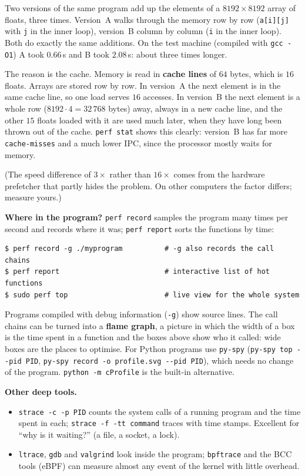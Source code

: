 \begin{example}
Two versions of the same program add up the elements of a $8192\times8192$ array of floats, three times. Version~A walks through the memory row by row (\texttt{a[i][j]} with \texttt{j} in the inner loop), version~B column by column (\texttt{i} in the inner loop). Both do exactly the same additions. On the test machine (compiled with \texttt{gcc -O1}) A took $0.66$\,s and B took $2.08$\,s: about three times longer.

The reason is the cache. Memory is read in \textbf{cache lines} of $64$ bytes, which is $16$ floats. Arrays are stored row by row. In version~A the next element is in the same cache line, so one load serves $16$ accesses. In version~B the next element is a whole row ($8192\cdot4=32\,768$ bytes) away, always in a new cache line, and the other $15$ floats loaded with it are used much later, when they have long been thrown out of the cache. \texttt{perf stat} shows this clearly: version~B has far more \texttt{cache-misses} and a much lower IPC, since the processor mostly waits for memory.
\end{example}
(The speed difference of $3\times$ rather than $16\times$ comes from the hardware prefetcher that partly hides the problem. On other computers the factor differs; measure yours.)

\textbf{Where in the program?} \texttt{perf record} samples the program many times per second and records where it was; \texttt{perf report} sorts the functions by time:
\begin{verbatim}
$ perf record -g ./myprogram          # -g also records the call chains
$ perf report                         # interactive list of hot functions
$ sudo perf top                       # live view for the whole system
\end{verbatim}
Programs compiled with debug information (\texttt{-g}) show source lines. The call chains can be turned into a \textbf{flame graph}, a picture in which the width of a box is the time spent in a function and the boxes above show who it called: wide boxes are the places to optimise. For Python programs use \texttt{py-spy} (\verb|py-spy top --pid PID|, \verb|py-spy record -o profile.svg --pid PID|), which needs no change of the program. \texttt{python -m cProfile} is the built-in alternative.

\textbf{Other deep tools.}
\begin{itemize}[nosep]
  \item \texttt{strace -c -p PID} counts the system calls of a running program and the time spent in each; \texttt{strace -f -tt command} traces with time stamps. Excellent for ``why is it waiting?'' (a file, a socket, a lock).
  \item \texttt{ltrace}, \texttt{gdb} and \texttt{valgrind} look inside the program; \texttt{bpftrace} and the BCC tools (eBPF) can measure almost any event of the kernel with little overhead.
\end{itemize}

